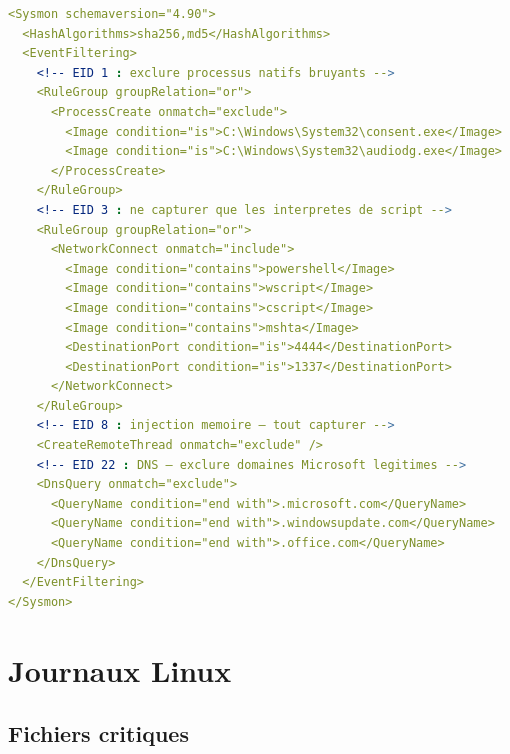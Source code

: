 \begin{lstlisting}[style=StyleCode, language=YAML,
  caption={sysmonconfig.xml minimal --- LiZbiZ-SIS},
  label={lst:sysmon-config}]
<Sysmon schemaversion="4.90">
  <HashAlgorithms>sha256,md5</HashAlgorithms>
  <EventFiltering>
    <!-- EID 1 : exclure processus natifs bruyants -->
    <RuleGroup groupRelation="or">
      <ProcessCreate onmatch="exclude">
        <Image condition="is">C:\Windows\System32\consent.exe</Image>
        <Image condition="is">C:\Windows\System32\audiodg.exe</Image>
      </ProcessCreate>
    </RuleGroup>
    <!-- EID 3 : ne capturer que les interpretes de script -->
    <RuleGroup groupRelation="or">
      <NetworkConnect onmatch="include">
        <Image condition="contains">powershell</Image>
        <Image condition="contains">wscript</Image>
        <Image condition="contains">cscript</Image>
        <Image condition="contains">mshta</Image>
        <DestinationPort condition="is">4444</DestinationPort>
        <DestinationPort condition="is">1337</DestinationPort>
      </NetworkConnect>
    </RuleGroup>
    <!-- EID 8 : injection memoire — tout capturer -->
    <CreateRemoteThread onmatch="exclude" />
    <!-- EID 22 : DNS — exclure domaines Microsoft legitimes -->
    <DnsQuery onmatch="exclude">
      <QueryName condition="end with">.microsoft.com</QueryName>
      <QueryName condition="end with">.windowsupdate.com</QueryName>
      <QueryName condition="end with">.office.com</QueryName>
    </DnsQuery>
  </EventFiltering>
</Sysmon>
\end{lstlisting}

\section{Journaux Linux}
\label{sec:logs-linux}

\subsection{Fichiers critiques}

